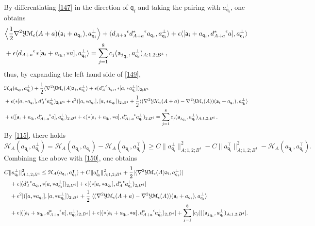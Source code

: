 \documentclass[11pt]{article}
\numberwithin{equation}{section} \setlength{\topmargin}{-35pt}
\newcommand{\YMe}{\mathcal{YM}_{\epsilon}}
\newcommand{\q}{\mathsf{q}}
\newcommand{\A}{\mathsf{a}}
\begin{document}
\smallskip
By differentiating \eqref{147} in the direction of $\q_i$ and taking
the pairing with $a_{\q_i}^{\perp}$, one obtains
\begin{align}
\label{149}
&\Big\langle\frac{1}{2}\nabla^2\YMe(A+a)(\A_i+a_{\q_i}),a_{\q_i}^{\perp}\Big\rangle+\langle
{d_{A+a}}^{\epsilon}{d_{A+a}^{\ast}}^{\epsilon}a_{\q_i},a_{\q_i}^{\perp}\rangle
+\epsilon\langle[\A_i+a_{\q_i},{d_{A+a}^{\ast}}^{\epsilon}a],a_{\q_i}^{\perp}\rangle
\notag\\
& +\epsilon\langle {d_{A+a}}^{\epsilon}{\ast}[\A_i+a_{\q_i},\ast
a],a_{\q_i}^{\perp}\rangle
=\sum_{j=1}^8c_j({\A_j}_{\q_i},a_{\q_i}^{\perp})_{A;1,2;B^4}\,,
\end{align}
thus, by expanding the left hand side of \eqref{149},
\begin{align}
\label{150}
&\mathcal{H}_A(a_{\q_i},a_{\q_i}^{\perp})+\frac{1}{2}\langle\nabla^2\YMe(A)\A_i,a_{\q_i}^{\perp}\rangle+
\epsilon({d_A^{\ast}}^{\epsilon}a_{\q_i},\ast[a,\ast a_{\q_i}^{\perp}])_{2;B^4}\notag\\
&+\epsilon(\ast[a,\ast
a_{\q_i}],{d_A^{\ast}}^{\epsilon}a_{\q_i}^{\perp})_{2;B^4}+\epsilon^2([a,\ast
a_{\q_i}],[a,\ast a_{\q_i}])_{2;B^4}
 +\frac{1}{2}\langle(\nabla^2\YMe(A+a)-\nabla^2\YMe(A))(\A_i+a_{\q_i}),a_{\q_i}^{\perp}\rangle\notag\\
 & +\epsilon([\A_i+a_{\q_i},{d_{A+a}^{\ast}}^{\epsilon}a],a_{\q_i}^{\perp})_{2;B^4}+\epsilon(\ast[\A_i+a_{\q_i},\ast a],{d_{A+a}^{\ast}}^{\epsilon}a_{\q_i}^{\perp})_{2;B^4}
=\sum_{j=1}^8c_j({\A_j}_{\q_i},a_{\q_i}^{\perp})_{A;1,2;B^4}\,.
\end{align}
By \eqref{115}, there holds
\begin{equation}
\mathcal{H}_A(a_{\q_i},a_{\q_i}^{\perp})=\mathcal{H}_A(a_{\q_i},a_{\q_i})-
\mathcal{H}_A(a_{\q_i},a_{\q_i}^{\intercal}) \ge
C\|a_{\q_i}^{\perp}\|_{A;1,2;B^4}^2-C\|a_{\q_i}^{\intercal}\|_{A;1,2;B^4}^2-\mathcal{H}_A(a_{\q_i},a_{\q_i}^{\intercal}).
\end{equation}
Combining the above with \eqref{150}, one obtains
\begin{align}
\label{152} &C\|a_{\q_i}^{\perp}\|_{A;1,2;B^4}^2\le
\mathcal{H}_A(a_{\q_i},a_{\q_i}^{\intercal})+C\|a_{\q_i}^{\intercal}\|_{A;1,2;B^4}^2+
\frac{1}{2}|\langle\nabla^2\YMe(A)\A_i,a_{\q_i}^{\perp}\rangle|\notag\\
&\quad +\epsilon|({d_A^{\ast}}^{\epsilon}a_{\q_i},\ast[a,\ast a_{\q_i}^{\perp}])_{2;B^4}|+\epsilon|(\ast[a,\ast a_{\q_i}],{d_A^{\ast}}^{\epsilon}a_{\q_i}^{\perp})_{2;B^4}|\notag\\
&\quad+\epsilon^2|([a,\ast a_{\q_i}],[a,\ast
a_{\q_i}^{\perp}])_{2;B^4}+\frac{1}{2}|\langle(\nabla^2\YMe(A+a)-
\nabla^2\YMe(A))(\A_i+a_{\q_i}),a_{\q_i}^{\perp}\rangle|\notag\\
&\quad+\epsilon|([\A_i+a_{\q_i},{d_{A+a}^{\ast}}^{\epsilon}a],a_{\q_i}^{\perp})_{2;B^4}|+
\epsilon|(\ast[\A_i+a_{\q_i},\ast
a],{d_{A+a}^{\ast}}^{\epsilon}a_{\q_i}^{\perp})_{2;B^4}|
 +\sum_{j=1}^8|c_j||({\A_j}_{\q_i},a_{\q_i}^{\perp})_{A;1,2;B^4}|.
\end{align}
\end{document}
